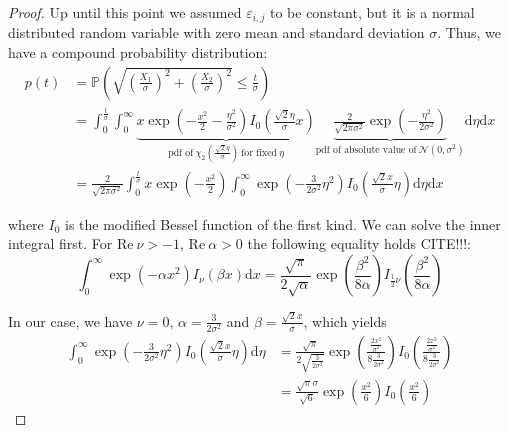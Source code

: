 \documentclass[a4paper,12pt]{article}
\theoremstyle{plain}
\theoremstyle{definition}
\theoremstyle{remark}
\begin{document}
\begin{proof}
	Up until this point we assumed $\varepsilon_{i, j}$ to be constant, but it is a normal distributed random variable with zero mean and standard deviation $\sigma$. Thus, we have a compound probability distribution:
	\begin{align*}
		p(t) &= \mathbb{P}\left( \sqrt{\left( \frac{X_1}{\sigma} \right)^2 + \left( \frac{X_2}{\sigma} \right)^2} \leq \frac{t}{\sigma} \right) \\
		&= \int_0^\frac{t}{\sigma} \int_0^\infty \underbrace{x \exp \left( - \frac{x^2}{2} - \frac{\eta^2}{\sigma^2} \right) I_0 \left( \frac{\sqrt{2} \eta}{\sigma} x \right)}_{\textrm{pdf of} \ \chi_2 \left( \frac{\sqrt{2} \eta}{\sigma} \right) \ \textrm{for fixed} \ \eta} \underbrace{\frac{2}{\sqrt{2 \pi \sigma^2}} \exp \left( - \frac{\eta^2}{2 \sigma^2} \right)}_{\textrm{pdf of absolute value of} \ \mathcal{N}(0, \sigma^2)} \mathrm{d}\eta \mathrm{d}x \\
		&= \frac{2}{\sqrt{2 \pi \sigma^2}} \int_0^\frac{t}{\sigma} x \exp \left( - \frac{x^2}{2} \right) \int_0^\infty \exp \left( - \frac{3}{2 \sigma^2} \eta^2 \right) I_0 \left( \frac{\sqrt{2} x}{\sigma} \eta \right) \mathrm{d}\eta \mathrm{d}x
	\end{align*}
	
	where $I_0$ is the modified Bessel function of the first kind. We can solve the inner integral first. For $\mathrm{Re} \ \nu > -1$, $\mathrm{Re} \ \alpha > 0$ the following equality holds CITE!!!:
	\begin{equation}\label{eqintbessel}
		\int_0^\infty \exp \left( - \alpha x^2 \right) I_\nu ( \beta x ) \mathrm{d}x = \frac{\sqrt{\pi}}{2 \sqrt{\alpha}} \exp \left( \frac{\beta^2}{8 \alpha} \right) I_{\frac{1}{2} \nu} \left( \frac{\beta^2}{8 \alpha} \right)
	\end{equation}
	
	In our case, we have $\nu = 0$, $\alpha = \frac{3}{2 \sigma^2}$ and $\beta = \frac{\sqrt{2} x}{\sigma}$, which yields
	\begin{align*}
		\int_0^\infty \exp \left( - \frac{3}{2 \sigma^2} \eta^2 \right) I_0 \left( \frac{\sqrt{2} x}{\sigma} \eta \right) \mathrm{d}\eta &= \frac{\sqrt{\pi}}{2 \sqrt{\frac{3}{2 \sigma^2}}} \exp \left( \frac{\frac{2 x^2}{\sigma^2}}{8 \frac{3}{2 \sigma^2}} \right) I_0 \left( \frac{\frac{2 x^2}{\sigma^2}}{8 \frac{3}{2 \sigma^2}} \right) \\
		&= \frac{\sqrt{\pi} \sigma}{\sqrt{6}} \exp \left( \frac{x^2}{6} \right) I_0 \left( \frac{x^2}{6} \right)
	\end{align*}
	

\end{proof}
\end{document}
